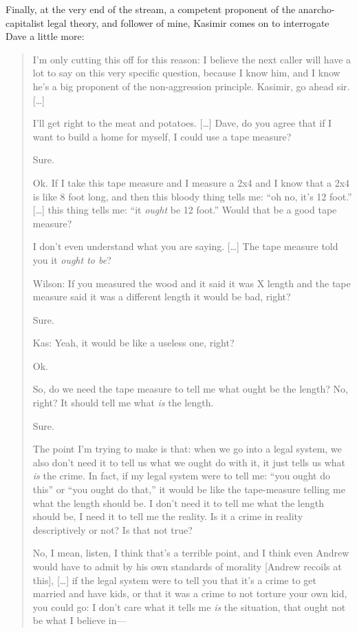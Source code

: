 \documentclass[11pt]{article}
\begin{document}
Finally, at the very end of the stream, a competent proponent of the anarcho-capitalist legal theory, and follower of mine, Kasimir comes on to interrogate Dave a little more:
\begin{quote}
I'm only cutting this off for this reason: I believe the next caller will have a lot to say on this very specific question, because I know him, and I know he's a big proponent of the non-aggression principle. Kasimir, go ahead sir. [\ldots{}]

I'll get right to the meat and potatoes. [\ldots{}] Dave, do you agree that if I want to build a home for myself, I could use a tape measure?

Sure.

Ok. If I take this tape measure and I measure a 2x4 and I know that a 2x4 is like 8 foot long, and then this bloody thing tells me: ``oh no, it's 12 foot.'' [\ldots{}] this thing tells me: ``it \emph{ought} be 12 foot.'' Would that be a good tape measure?

I don't even understand what you are saying. [\ldots{}] The tape measure told you it \emph{ought to be}?

Wilson: If you measured the wood and it said it was X length and the tape measure said it was a different length it would be bad, right?

Sure.

Kas: Yeah, it would be like a useless one, right?

Ok.

So, do we need the tape measure to tell me what ought be the length? No, right? It should tell me what \emph{is} the length.

Sure.

The point I'm trying to make is that: when we go into a legal system, we also don't need it to tell us what we ought do with it, it just tells us what \emph{is} the crime. In fact, if my legal system were to tell me: ``you ought do this'' or ``you ought do that,'' it would be like the tape-measure telling me what the length should be. I don't need it to tell me what the length should be, I need it to tell me the reality. Is it a crime in reality descriptively or not? Is that not true?

No, I mean, listen, I think that's a terrible point, and I think even Andrew would have to admit by his own standards of morality [Andrew recoils at this], [\ldots{}] if the legal system were to tell you that it's a crime to get married and have kids, or that it was a crime to not torture your own kid, you could go: I don't care what it tells me \emph{is} the situation, that ought not be what I believe in---


\end{quote}
\end{document}
